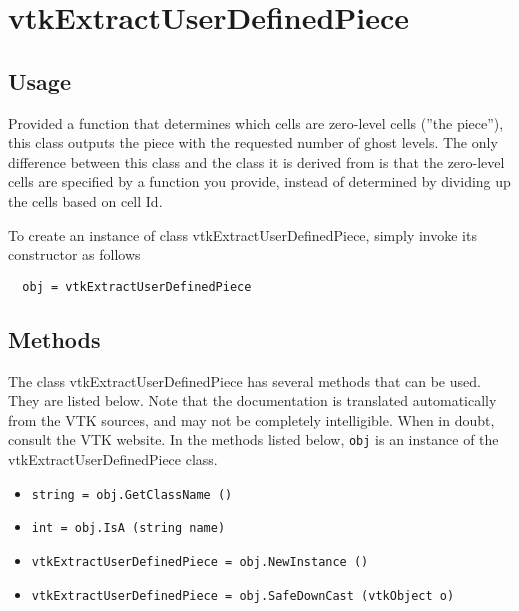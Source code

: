 \section{vtkExtractUserDefinedPiece}

\subsection{Usage}

 Provided a function that determines which cells are zero-level
 cells (''the piece''), this class outputs the piece with the 
 requested number of ghost levels.  The only difference between 
 this class and the class it is derived from is that the 
 zero-level cells are specified by a function you provide, 
 instead of determined by dividing up the cells based on cell Id.


To create an instance of class vtkExtractUserDefinedPiece, simply
invoke its constructor as follows
\begin{verbatim}
  obj = vtkExtractUserDefinedPiece
\end{verbatim}
\subsection{Methods}

The class vtkExtractUserDefinedPiece has several methods that can be used.
  They are listed below.
Note that the documentation is translated automatically from the VTK sources,
and may not be completely intelligible.  When in doubt, consult the VTK website.
In the methods listed below, \verb|obj| is an instance of the vtkExtractUserDefinedPiece class.
\begin{itemize}
\item  \verb|string = obj.GetClassName ()|

\item  \verb|int = obj.IsA (string name)|

\item  \verb|vtkExtractUserDefinedPiece = obj.NewInstance ()|

\item  \verb|vtkExtractUserDefinedPiece = obj.SafeDownCast (vtkObject o)|

\end{itemize}
